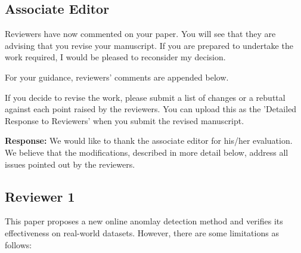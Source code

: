 \documentclass{article}
\makeatletter
\newenvironment{comment}{
\begin{sloppypar}\slshape
\vspace{5 mm}
\color{blue}
 \@beginparpenalty\@M
  \begin{list}{}{\setlength{\topsep}{0ex}%
  \setlength{\leftmargin}{\rightmargin}}\item[]
 \@beginparpenalty\@endparpenalty
}
{\end{list}
\end{sloppypar}
}
\makeatother
\begin{document}
\subsection*{Associate Editor}

\begin{comment}
Reviewers have now commented on your paper. You will see that they are advising that you revise your manuscript. If you are prepared to undertake the work required, I would be pleased to reconsider my decision.

For your guidance, reviewers' comments are appended below.

If you decide to revise the work, please submit a list of changes or a rebuttal against each point raised by the reviewers. You can upload this as the 'Detailed Response to Reviewers' when you submit the revised manuscript.
\end{comment}
{\bf Response:}
We would like to thank the associate editor for his/her evaluation. We
believe that the modifications, described in more detail below,
address all issues pointed out by the reviewers.

\subsection*{Reviewer 1}
\begin{comment}
This paper proposes a new online anomlay detection method and verifies its effectiveness on real-world datasets. However, there are some limitations as follows:
\end{comment}
\end{document}
